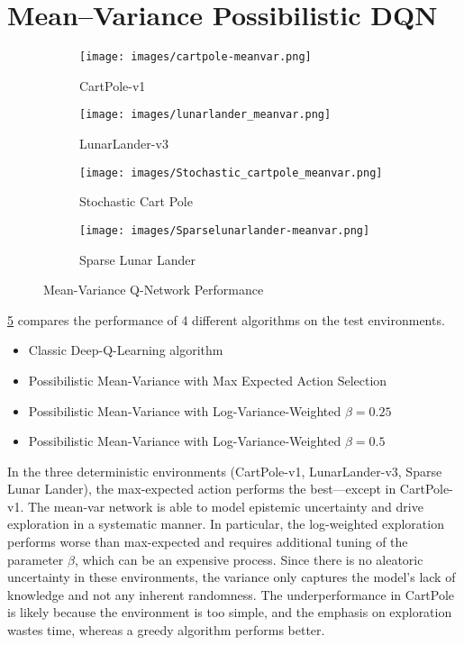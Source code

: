\documentclass[11pt,a4paper]{report}
\begin{document}
\section{Mean–Variance Possibilistic DQN}
\begin{figure}[ht]
  \centering
  \begin{subfigure}[b]{0.24\textwidth}
    \texttt{[image: images/cartpole-meanvar.png]}
    \caption{CartPole-v1}
    \label{fig:im1}
  \end{subfigure}
  \hfill
  \begin{subfigure}[b]{0.24\textwidth}
    \texttt{[image: images/lunarlander\_meanvar.png]}
    \caption{LunarLander-v3}
    \label{fig:im2}
  \end{subfigure}
  \hfill
  \begin{subfigure}[b]{0.24\textwidth}
    \texttt{[image: images/Stochastic\_cartpole\_meanvar.png]}
    \caption{Stochastic Cart Pole}
    \label{fig:im3}
  \end{subfigure}
  \hfill
  \begin{subfigure}[b]{0.24\textwidth}
    \texttt{[image: images/Sparselunarlander-meanvar.png]}
    \caption{Sparse Lunar Lander}
    \label{fig:im4}
  \end{subfigure}
  
  \caption{Mean-Variance Q-Network Performance}
  \label{fig:mvar-res}
\end{figure}

\ref{fig:mvar-res}  compares the performance of 4 different algorithms on the test environments.
\begin{itemize}
  \item Classic Deep-Q-Learning algorithm
  \item Possibilistic Mean-Variance with Max Expected Action Selection
  \item Possibilistic Mean-Variance with Log-Variance-Weighted $\beta = 0.25$
  \item Possibilistic Mean-Variance with Log-Variance-Weighted $\beta = 0.5$
\end{itemize}

In the three deterministic environments (CartPole-v1, LunarLander-v3, Sparse Lunar Lander), the max-expected action performs the best—except in CartPole-v1. The mean-var network is able to model epistemic uncertainty and drive exploration in a systematic manner. In particular, the log-weighted exploration performs worse than max-expected and requires additional tuning of the parameter $\beta$, which can be an expensive process. Since there is no aleatoric uncertainty in these environments, the variance only captures the model’s lack of knowledge and not any inherent randomness. The underperformance in CartPole is likely because the environment is too simple, and the emphasis on exploration wastes time, whereas a greedy algorithm performs better.
\end{document}

